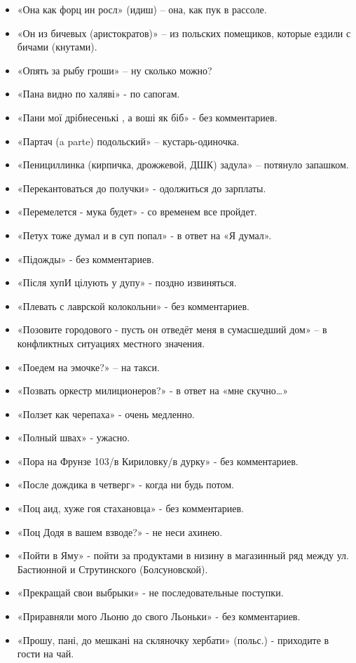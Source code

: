 \begin{itemize}
\item  «Она как форц ин росл» (идиш) – она, как пук в рассоле.
\item  «Он из бичевых (аристократов)» – из польских помещиков, которые ездили с бичами (кнутами). 
\item  «Опять за рыбу гроши» – ну сколько можно?
\item  «Пана видно по халяві» - по сапогам.
\item  «Пани мої дрібнесенькі , а воші як біб» - без комментариев.
\item  «Партач (a parte) подольский» – кустарь-одиночка.  
\item  «Пенициллинка (кирпичка, дрожжевой, ДШК) задула» – потянуло запашком.
\item  «Перекантоваться до получки» - одолжиться до зарплаты.
\item  «Перемелется - мука будет» - со временем все пройдет.
\item  «Петух тоже думал и в суп попал» - в ответ на «Я думал».
\item  «Підожды» - без комментариев.
\item  «Після хупИ цілують у дупу» - поздно извиняться.
\item  «Плевать с лаврской колокольни» - без комментариев.
\item  «Позовите городового - пусть он отведёт меня в сумасшедший дом» – в конфликтных ситуациях местного значения.
\item  «Поедем на эмочке?» – на такси.
\item  «Позвать оркестр милиционеров?» - в ответ на «мне скучно…»
\item  «Ползет как черепаха» - очень медленно.
\item  «Полный швах» - ужасно.
\item  «Пора на Фрунзе 103/в Кириловку/в дурку» - без комментариев.
\item  «После дождика в четверг» - когда ни будь потом.
\item  «Поц аид, хуже гоя стахановца» - без комментариев.
\item  «Поц Додя в вашем взводе?» - не неси ахинею.
\item  «Пойти в Яму» - пойти за продуктами в низину в магазинный ряд между ул. Бастионной и Струтинского (Болсуновской). 
\item  «Прекращай свои выбрыки» - не последовательные поступки.
\item  «Приравняли мого Льоню до свого Льоньки» - без комментариев.
\item  «Прошу, пані, до мешкані на скляночку хербати» (польс.) - приходите в гости на чай.

\end{itemize}
